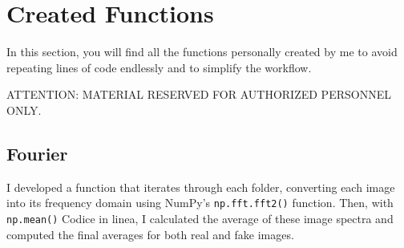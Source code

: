 \documentclass[12pt]{article}
\begin{document}
    \section{Created Functions}\label{created-functions}

In this section, you will find all the functions personally created by
me to avoid repeating lines of code endlessly and to simplify the
workflow.

ATTENTION: MATERIAL RESERVED FOR AUTHORIZED PERSONNEL ONLY.

    \subsection{Fourier}\label{fourier}

I developed a function that iterates through each folder, converting
each image into its frequency domain using NumPy's
\texttt{np.fft.fft2()} function. Then, with \texttt{np.mean()} Codice in
linea, I calculated the average of these image spectra and computed the
final averages for both real and fake images.
\end{document}
